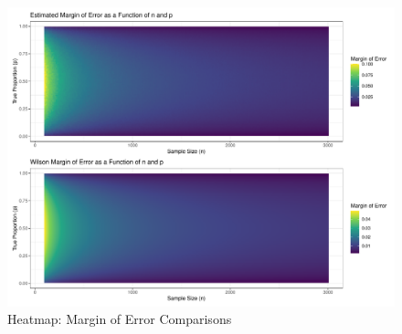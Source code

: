 \documentclass{article}\usepackage[]{graphicx}\usepackage[]{xcolor}
\makeatletter
\def\maxwidth{ %
  \ifdim\Gin@nat@width>\linewidth
    \linewidth
  \else
    \Gin@nat@width
  \fi
}
\newenvironment{knitrout}{}{} %
\makeatother
\begin{document}
\begin{figure}[H]
\begin{center}
\begin{knitrout}
\color{fgcolor}

{\centering \includegraphics[width=\maxwidth]{figure/unnamed-chunk-6-1} 

}


\end{knitrout}
\caption{Heatmap: Margin of Error Comparisons}
\label{plot3} 
\end{center}
\end{figure}
\end{document}
